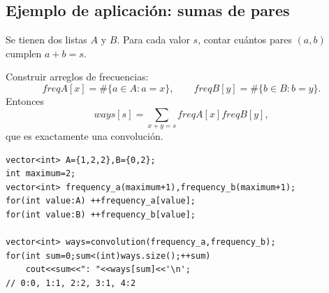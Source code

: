 \subsection{Ejemplo de aplicación: sumas de pares}

Se tienen dos listas $A$ y $B$. Para cada valor $s$, contar cuántos pares
$(a,b)$ cumplen $a+b=s$.

Construir arreglos de frecuencias:
\[
freqA[x]=\#\{a\in A:a=x\},\qquad
freqB[y]=\#\{b\in B:b=y\}.
\]
Entonces
\[
ways[s]=\sum_{x+y=s}freqA[x]freqB[y],
\]
que es exactamente una convolución.

\begin{lstlisting}[style=cpp]
vector<int> A={1,2,2},B={0,2};
int maximum=2;
vector<int> frequency_a(maximum+1),frequency_b(maximum+1);
for(int value:A) ++frequency_a[value];
for(int value:B) ++frequency_b[value];

vector<int> ways=convolution(frequency_a,frequency_b);
for(int sum=0;sum<(int)ways.size();++sum)
    cout<<sum<<": "<<ways[sum]<<'\n';
// 0:0, 1:1, 2:2, 3:1, 4:2
\end{lstlisting}
